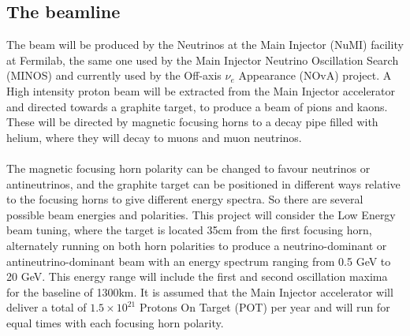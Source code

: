 \documentclass[12pt]{article}
\begin{document}
\subsection{The beamline}
The beam will be produced by the Neutrinos at the Main Injector (NuMI) facility at Fermilab, the same one used by the Main Injector Neutrino Oscillation Search (MINOS) \cite{MINOS} and currently used by the Off-axis $\nu_e$ Appearance (NOvA) project\cite{NOvA}. A High intensity proton beam will be extracted from the Main Injector accelerator and directed towards a graphite target, to produce a beam of pions and kaons. These will be directed by magnetic focusing horns to a decay pipe filled with helium, where they will decay to muons and muon neutrinos.\\\\
The magnetic focusing horn polarity can be changed to favour neutrinos or antineutrinos, and the graphite target can be positioned in different ways relative to the focusing horns to give different energy spectra. So there are several possible beam energies and polarities. This project will consider the Low Energy beam tuning, where the target is located 35cm from the first focusing horn, alternately running on both horn polarities to produce a neutrino-dominant or antineutrino-dominant beam with an energy spectrum ranging from 0.5 GeV to 20 GeV\cite{LBNE}. This energy range will include the first and second oscillation maxima for the baseline of 1300km. It is assumed that the Main Injector accelerator will deliver a total of $1.5\times 10^{21}$ Protons On Target (POT) per year and will run for equal times with each focusing horn polarity.
\end{document}

